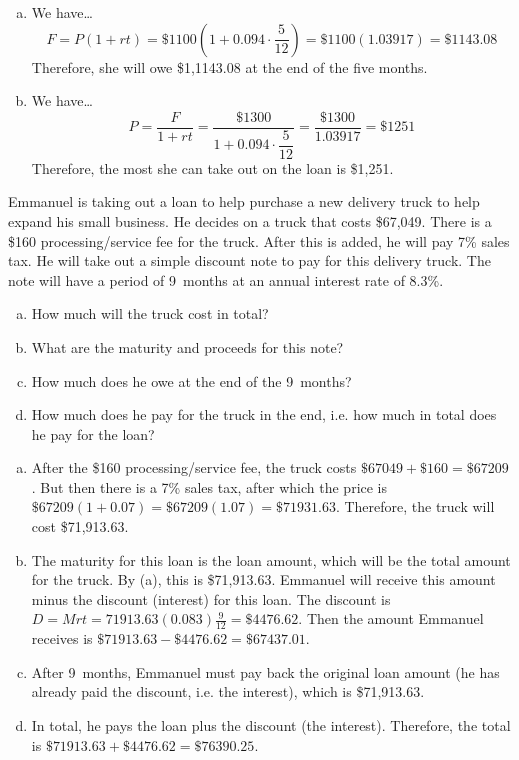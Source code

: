 \documentclass[11pt,letterpaper]{article}
\begin{document}
\sol 
\begin{enumerate}[(a)]
\item We have\dots
	\[
	F= P(1 + rt)= \$1100 \left(1 + 0.094 \cdot \frac{5}{12} \right)= \$1100(1.03917)= \$1143.08
	\] 
Therefore, she will owe \$1,1143.08 at the end of the five months. \pspace

\item We have\dots
	\[
	P= \dfrac{F}{1 + rt}= \dfrac{\$1300}{1 + 0.094 \cdot \dfrac{5}{12}}= \dfrac{\$1300}{1.03917}= \$1251
	\]
Therefore, the most she can take out on the loan is \$1,251. 
\end{enumerate}



\newpage



 Emmanuel is taking out a loan to help purchase a new delivery truck to help expand his small business. He decides on a truck that costs \$67,049. There is a \$160 processing/service fee for the truck. After this is added, he will pay 7\% sales tax. He will take out a simple discount note to pay for this delivery truck. The note will have a period of 9~months at an annual interest rate of 8.3\%.
	\begin{enumerate}[(a)]
	\item How much will the truck cost in total?
	\item What are the maturity and proceeds for this note?
	\item How much does he owe at the end of the 9~months?
	\item How much does he pay for the truck in the end, i.e. how much in total does he pay for the loan?
	\end{enumerate} \pspace

\sol 
\begin{enumerate}[(a)]
\item After the \$160 processing/service fee, the truck costs $\$67049 + \$160= \$67209$. But then there is a 7\% sales tax, after which the price is $\$67209(1 + 0.07)= \$67209(1.07)= \$71931.63$. Therefore, the truck will cost \$71,913.63. \pspace

\item The maturity for this loan is the loan amount, which will be the total amount for the truck. By (a), this is \$71,913.63. Emmanuel will receive this amount minus the discount (interest) for this loan. The discount is $D= Mrt= 71913.63(0.083) \frac{9}{12}= \$4476.62$. Then the amount Emmanuel receives is $\$71913.63 - \$4476.62= \$67437.01$. \pspace

\item After 9~months, Emmanuel must pay back the original loan amount (he has already paid the discount, i.e. the interest), which is \$71,913.63. \pspace

\item In total, he pays the loan plus the discount (the interest). Therefore, the total is $\$71913.63 + \$4476.62= \$76390.25$. 
\end{enumerate}
\end{document}
